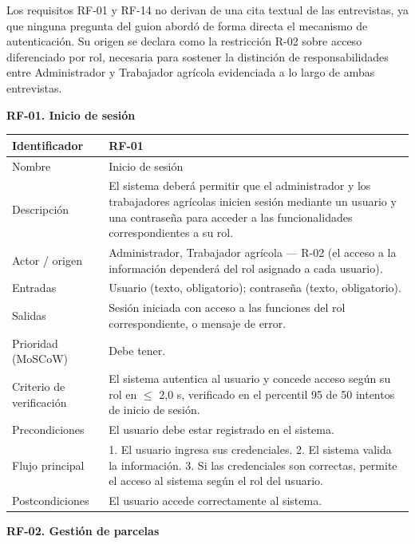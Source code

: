 \documentclass[12pt,a4paper]{article}
\begin{document}
Los requisitos RF-01 y RF-14 no derivan de una cita textual de las entrevistas, ya que ninguna pregunta del guion abordó de forma directa el mecanismo de autenticación. Su origen se declara como la restricción R-02 sobre acceso diferenciado por rol, necesaria para sostener la distinción de responsabilidades entre Administrador y Trabajador agrícola evidenciada a lo largo de ambas entrevistas.

\bigskip
\noindent\textbf{RF-01. Inicio de sesión}
\label{tab:RF-01}

\begin{center}
\begin{longtable}{|p{3.5cm}|p{10.7cm}|}
\hline
Identificador & RF-01 \\
\hline
Nombre & Inicio de sesión \\
\hline
Descripción & El sistema deberá permitir que el administrador y los trabajadores agrícolas inicien sesión mediante un usuario y una contraseña para acceder a las funcionalidades correspondientes a su rol. \\
\hline
Actor / origen & Administrador, Trabajador agrícola --- R-02 (el acceso a la información dependerá del rol asignado a cada usuario). \\
\hline
Entradas & Usuario (texto, obligatorio); contraseña (texto, obligatorio). \\
\hline
Salidas & Sesión iniciada con acceso a las funciones del rol correspondiente, o mensaje de error. \\
\hline
Prioridad (MoSCoW) & Debe tener. \\
\hline
Criterio de verificación & El sistema autentica al usuario y concede acceso según su rol en $\leq$ 2,0 s, verificado en el percentil 95 de 50 intentos de inicio de sesión. \\
\hline
Precondiciones & El usuario debe estar registrado en el sistema. \\
\hline
Flujo principal & 1. El usuario ingresa sus credenciales. 2. El sistema valida la información. 3. Si las credenciales son correctas, permite el acceso al sistema según el rol del usuario. \\
\hline
Postcondiciones & El usuario accede correctamente al sistema. \\
\hline
\end{longtable}
\end{center}

\bigskip
\noindent\textbf{RF-02. Gestión de parcelas}
\label{tab:RF-02}
\end{document}

